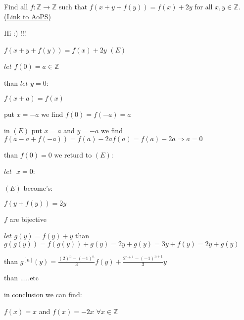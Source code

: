 \begin{problem}
	Find all $f: \mathbb Z \to \mathbb Z$ such that $f(x+y+f(y))=f(x)+2y$ for all $ x,y\in \mathbb Z$.
	\flushright \href{https://artofproblemsolving.com/community/c6h272196}{(Link to AoPS)}
\end{problem}



\begin{solution}
	Hi :) !!!

$ f(x + y + f(y)) = f(x) + 2y$ $ (E)$

$ let$ $ f(0) = a \in \mathbb{Z}$

than $ let$ $ y = 0$:

$ f(x + a) = f(x)$ 

put $ x = - a$ we find $ f(0) = f( - a) = a$ 

in $ (E)$ put $ x = a$ and $ y = - a$ we find $ f(a - a + f( - a)) = f(a) - 2a %
f(a) = f(a) - 2a \Rightarrow a = 0$

than $ f(0) = 0$ we returd to $ (E)$:

$ let \ \ \ x = 0$:

$ (E)$ become's:

$ f(y + f(y)) = 2y$ 

$ f$ are bijective

$ let$ $ g(y) = f(y) + y$ than $ g(g(y)) = f(g(y)) + g(y) = 2y + g(y) = 3y + f(y) = 2y + g(y)$

than $ g^{[n]}(y) = \frac {(2)^n - ( - 1)^n}{3}f(y) + \frac {2^{n + 1} - ( - 1)^{n + 1}}{3}y$

than .....etc

in conclusion we can find: 

$ f(x) = x$ and $ f(x) = - 2x$ $ \forall x \in \mathbb{Z}$
\end{solution}



